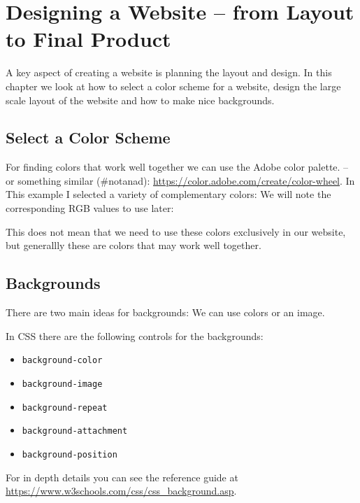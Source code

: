 \documentclass[11pt,a4paper]{report}
\begin{document}
\newpage

\section{Designing a Website -- from Layout to Final Product}

A key aspect of creating a website is planning the layout and design. In this chapter we look at how to select a color scheme for a website, design the large scale layout of the website and how to make nice backgrounds.

\subsection{Select a Color Scheme}
For finding colors that work well together we can use the Adobe color palette. -- or something similar (\#notanad): \url{https://color.adobe.com/create/color-wheel}.  In This example I selected a variety of complementary colors:
We will note the corresponding RGB values to use later: 



This does not mean that we need to use these colors exclusively in our website, but generallly these are colors that may work well together.

\subsection{Backgrounds}
There are two main ideas for backgrounds: We can use colors or an image. 

In CSS there are the following controls for the backgrounds: 
\begin{itemize}
\item \verb|background-color|
\item \verb|background-image|
\item \verb|background-repeat|
\item \verb|background-attachment|
\item \verb|background-position|
\end{itemize}
For in depth details you can see the reference guide at \url{https://www.w3schools.com/css/css_background.asp}. 
\end{document}
